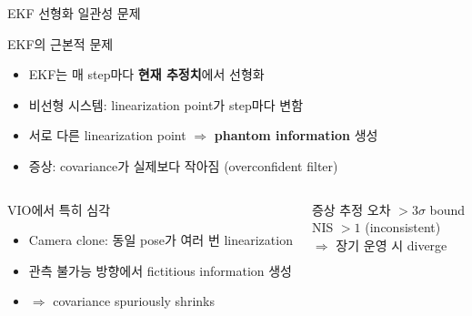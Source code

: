 
\begin{frame}{EKF 선형화 일관성 문제}
  \begin{block}{EKF의 근본적 문제}
    \begin{itemize}
      \item EKF는 매 step마다 \textbf{현재 추정치}에서 선형화
      \item 비선형 시스템: linearization point가 step마다 변함
      \item 서로 다른 linearization point $\Rightarrow$ \textbf{phantom information} 생성
      \item 증상: covariance가 실제보다 작아짐 (overconfident filter)
    \end{itemize}
  \end{block}
  \begin{columns}[T]
      \begin{alertblock}{VIO에서 특히 심각}
        \begin{itemize}
          \item Camera clone: 동일 pose가 여러 번 linearization
          \item 관측 불가능 방향에서 fictitious information 생성
          \item $\Rightarrow$ covariance spuriously shrinks
        \end{itemize}
      \end{alertblock}
      \begin{exampleblock}{증상}
        추정 오차 $> 3\sigma$ bound\\
        NIS $> 1$ (inconsistent)\\
        $\Rightarrow$ 장기 운영 시 diverge
      \end{exampleblock}
  \end{columns}
\end{frame}


